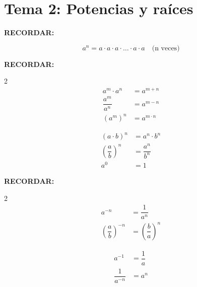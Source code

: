\documentclass[a4paper,12pt]{article}
\newenvironment{boxsummary}{%
  \def\FrameCommand{\fcolorbox{black}{graybox}}%
  \MakeFramed{\FrameRestore}%
  \small\textbf{RECORDAR:}\par\smallskip
}{%
  \endMakeFramed
}
\begin{document}
\section*{Tema 2: Potencias y raíces}

\begin{boxsummary}
\[ a^n = a \cdot a \cdot a \cdot \dots \cdot a \cdot a \quad \text{(n veces)} \]
\end{boxsummary}

\begin{boxsummary}
\begin{multicols}{2}
\begin{align*}
a^m \cdot a^n &= a^{m+n} \\[6pt]
\dfrac{a^m}{a^n} &= a^{m-n} \\[6pt]
\left(a^m\right)^n &= a^{m \cdot n}
\end{align*}

\columnbreak

\begin{align*}
(a \cdot b)^n &= a^n \cdot b^n \\[6pt]
\left(\dfrac{a}{b}\right)^n &= \dfrac{a^n}{b^n} \\[6pt]
a^0 &= 1
\end{align*}
\end{multicols}
\end{boxsummary}

\begin{boxsummary}
\begin{multicols}{2}
\begin{align*}
a^{-n} &= \dfrac{1}{a^n} \\[10pt]
\left(\dfrac{a}{b}\right)^{-n} &= \left(\dfrac{b}{a}\right)^n
\end{align*}

\columnbreak

\begin{align*}
a^{-1} &= \dfrac{1}{a} \\[10pt]
\dfrac{1}{a^{-n}} &= a^n
\end{align*}
\end{multicols}
\end{boxsummary}
\end{document}
